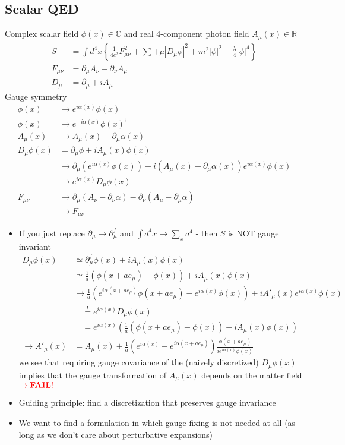 \documentclass[10pt,a4paper]{article}
\theoremstyle{definition}
\begin{document}
\subsection{Scalar QED}
Complex scalar field $\phi(x)\in\mathbb{C}$ and real 4-component photon field $A_\mu(x)\in\mathbb{R}$
\begin{align}
S&=\int d^4x\left\{\frac{1}{4e^2}F_{\mu\nu}^2+\sum+\mu|D_\mu\phi|^2+m^2|\phi|^2+\frac{\lambda}{4}|\phi|^4\right\}\\
F_{\mu\nu}&=\partial_\mu A_\nu-\partial_\nu A_\mu\\
D_\mu&=\partial_\mu+iA_\mu
\end{align}
Gauge symmetry
\begin{align}
\phi(x)&\rightarrow e^{i\alpha(x)}\phi(x)\\
\phi(x)^\dagger&\rightarrow e^{-i\alpha(x)}\phi(x)^\dagger\\
A_\mu(x)&\rightarrow A_\mu(x)-\partial_\mu\alpha(x)\\
D_\mu\phi(x)&=\partial_\mu\phi+iA_\mu(x)\phi(x)\\
&\rightarrow\partial_\mu
\left(e^{i\alpha(x)}\phi(x)\right)
+i\left(A_\mu(x)-\partial_\mu\alpha(x)\right)
e^{i\alpha(x)}\phi(x)\\
&\rightarrow e^{i\alpha(x)}D_\mu\phi(x)\\
F_{\mu\nu}&\rightarrow\partial_\mu(A_\nu-\partial_\nu\alpha)-\partial_\nu(A_\mu-\partial_\mu\alpha)\\
&\rightarrow F_{\mu\nu}
\end{align}
\begin{itemize}
\item If you just replace $\partial_\mu\rightarrow\partial_\mu^f$ and $\int d^4x\rightarrow\sum_xa^4$ - then $S$ is NOT gauge invariant 
\begin{align}
D_\mu\phi(x)
&\simeq\partial_\mu^f\phi(x)+iA_\mu(x)\phi(x)\\
&\simeq\frac{1}{a}(\phi(x+ae_\mu)-\phi(x))+iA_\mu(x)\phi(x)\\
&\rightarrow\frac{1}{a}(e^{i\alpha(x+ae_\mu)}\phi(x+ae_\mu)-e^{i\alpha(x)}\phi(x))+iA'_\mu(x)e^{i\alpha(x)}\phi(x)\\
&\quad\overset{!}{=}e^{i\alpha(x)}D_\mu\phi(x)\\
&\quad=e^{i\alpha(x)}\left(\frac{1}{a}(\phi(x+ae_\mu)-\phi(x))+iA_\mu(x)\phi(x)\right)\\
\rightarrow A'_\mu(x)&=A_\mu(x)+\frac{1}{a}\left(e^{i\alpha(x)}-e^{i\alpha(x+ae_\mu)}\right)\frac{\phi(x+ae_\mu)}{ie^{i\alpha(x)}\phi(x)}
\end{align}
we see that requiring gauge covariance of the (naively discretized) $D_\mu\phi(x)$ implies that the gauge transformation of $A_\mu(x)$ depends on the matter field ${\bf \textcolor{red}{\rightarrow FAIL!}}$ 

\item Guiding principle: find a discretization that preserves gauge invariance
\item We want to find a formulation in which gauge fixing is not needed at all (as long as we don't care about perturbative expansions)
\end{itemize}
\end{document}

